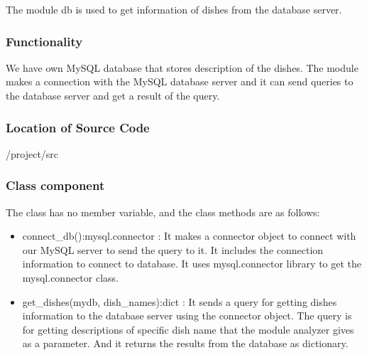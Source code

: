 The module db is used to get information of dishes from the database server.   
\subsubsection {Functionality}

We have own MySQL database that stores description of the dishes. The module makes a connection with the MySQL database server and it can send queries to the database server and get a result of the query. 


\subsubsection {Location of Source Code}

/project/src

\subsubsection {Class component}

The class has no member variable, and the class methods are as follows:

\begin{itemize}
\item connect\_db():mysql.connector :  It makes a connector object to connect with our MySQL server to send the query to it. It includes the connection information to connect to database. It uses mysql.connector library to get the mysql.connector class. 

\item get\_dishes(mydb, dish\_names):dict : It sends a query for getting dishes information to the database server using the connector object. The query is for getting descriptions of specific dish name that the module analyzer gives as a parameter. And it returns the results from the database as dictionary.  

\end{itemize} 

\FloatBarrier

